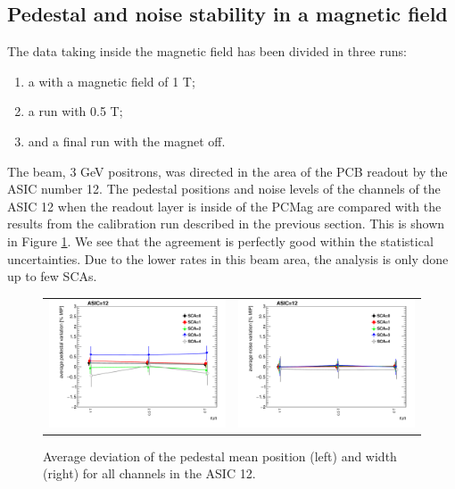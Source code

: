 \documentclass[a4paper,11pt]{article}
\begin{document}
\subsection{Pedestal and noise stability in a magnetic field}
\label{sec:magnetic}

The data taking inside the magnetic field has been divided in three runs:
\begin{enumerate}
\item a with a magnetic field of 1 T;
\item a run with 0.5 T;
\item and a final run with the magnet off.
\end{enumerate}

The beam, 3 GeV positrons, was directed in the area of the PCB readout by the ASIC number 12.
The pedestal positions and noise levels of the channels of the ASIC 12 when the
readout layer is inside of the PCMag are compared with the results from the calibration run described in the previous section.
This is shown in Figure \ref{pedestal_magnetic}.
We see that the agreement is perfectly good within the statistical uncertainties.
Due to the lower rates in this beam area, the
analysis is only done up to few SCAs.

\begin{figure}[!t]
  \centering
  \begin{tabular}{ll}
    \includegraphics[width=2.8in]{summary_pedestal_chip12-eps-converted-to.pdf} & \includegraphics[width=2.8in]{summary_noise_chip12-eps-converted-to.pdf}
  \end{tabular}
  \caption{Average deviation of the pedestal mean position (left) and width (right) for all channels in the ASIC 12.}
\label{pedestal_magnetic}
\end{figure}
\end{document}
